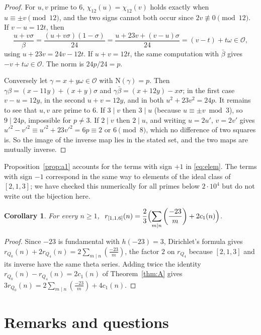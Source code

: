 \documentclass[11pt]{amsart}
\newtheorem{corollary}[lemma]{Corollary}
\theoremstyle{definition}
\theoremstyle{remark}
\newcommand{\leg}[2]{\left(\frac{#1}{#2}\right)}
\newcommand{\form}[3]{[#1,#2,#3]}
\begin{document}
\begin{proof}
For $u,v$ prime to $6$, $\chi_{12}(u)=\chi_{12}(v)$ holds exactly when $u\equiv\pm v\pmod{12}$, and the two signs cannot both occur since $2v\not\equiv0\pmod{12}$. If $v-u=12t$, then
\[
\frac{u+v\sigma}{\beta}=\frac{(u+v\sigma)(1-\sigma)}{24}=\frac{u+23v+(v-u)\sigma}{24}=(v-t)+t\omega\in\mathcal O,
\]
using $u+23v=24v-12t$. If $u+v=12t$, the same computation with $\bar\beta$ gives $-v+t\omega\in\mathcal O$. The norm is $24p/24=p$.

Conversely let $\gamma=x+y\omega\in\mathcal O$ with $\mathrm N(\gamma)=p$. Then $\gamma\beta=(x-11y)+(x+y)\sigma$ and $\gamma\bar\beta=(x+12y)-x\sigma$; in the first case $v-u=12y$, in the second $u+v=12y$, and in both $u^2+23v^2=24p$. It remains to see that $u,v$ are prime to $6$. If $3\mid v$ then $3\mid u$ (because $u\equiv\pm v\bmod 3$), so $9\mid 24p$, impossible for $p\ne3$. If $2\mid v$ then $2\mid u$, and writing $u=2u'$, $v=2v'$ gives $u'^2-v'^2\equiv u'^2+23v'^2=6p\equiv 2$ or $6\pmod 8$, which no difference of two squares is. So the image of the inverse map lies in the stated set, and the two maps are mutually inverse.
\end{proof}

Proposition~\ref{prop:a1} accounts for the terms with sign $+1$ in \eqref{eq:elem}. The terms with sign $-1$ correspond in the same way to elements of the ideal class of $\form{2}{1}{3}$; we have checked this numerically for all primes below $2\cdot10^4$ but do not write out the bijection here.

\begin{corollary}\label{cor:vdb}
For every $n\ge1$, $\ \displaystyle r_{[1,1,6]}(n)=\frac23\Bigl(\sum_{m\mid n}\leg{-23}{m}+2c_1(n)\Bigr)$.
\end{corollary}

\begin{proof}
Since $-23$ is fundamental with $h(-23)=3$, Dirichlet's formula gives $r_{Q_0}(n)+2r_{Q_4}(n)=2\sum_{m\mid n}\leg{-23}{m}$, the factor $2$ on $r_{Q_4}$ because $\form{2}{1}{3}$ and its inverse have the same theta series. Adding twice the identity $r_{Q_0}(n)-r_{Q_4}(n)=2c_1(n)$ of Theorem~\ref{thm:A} gives $3r_{Q_0}(n)=2\sum_{m\mid n}\leg{-23}{m}+4c_1(n)$.
\end{proof}

\section{Remarks and questions}\label{sec:questions}
\end{document}
